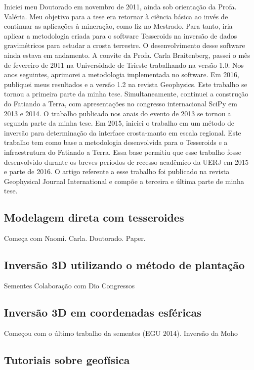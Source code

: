 Iniciei meu Doutorado em novembro de 2011, ainda sob orientação da Profa.
Valéria. Meu objetivo para a tese era retornar à ciência básica ao invés de
continuar as aplicações à mineração, como fiz no Mestrado. Para tanto, iria
aplicar a metodologia criada para o software Tesseroids na inversão de dados
gravimétricos para estudar a crosta terrestre. O desenvolvimento desse software
ainda estava em andamento. A convite da Profa. Carla Braitenberg, passei o mês
de fevereiro de 2011 na Universidade de Trieste trabalhando na versão 1.0. Nos
anos seguintes, aprimorei a metodologia implementada no software. Em 2016,
publiquei meus resultados e a versão 1.2 na revista Geophysics. Este trabalho
se tornou a primeira parte da minha tese. Simultaneamente, continuei a
construção do Fatiando a Terra, com apresentações no congresso internacional
SciPy em 2013 e 2014. O trabalho publicado nos anais do evento de 2013 se
tornou a segunda parte da minha tese. Em 2015, iniciei o trabalho em um método
de inversão para determinação da interface crosta-manto em escala regional.
Este trabalho tem como base a metodologia desenvolvida para o Tesseroids e a
infraestrutura do Fatiando a Terra. Essa base permitiu que esse trabalho fosse
desenvolvido durante os breves períodos de recesso acadêmico da UERJ em 2015 e
parte de 2016. O artigo referente a esse trabalho foi publicado na revista
Geophysical Journal International e compõe a terceira e última parte de minha
tese.



\subsection{Modelagem direta com tesseroides}

Começa com Naomi. Carla. Doutorado.
Paper.

\subsection{Inversão 3D utilizando o método de plantação}

Sementes
Colaboração com Dio
Congressos


\subsection{Inversão 3D em coordenadas esféricas}


Começou com o último trabalho da sementes (EGU 2014).
Inversão da Moho


\subsection{Tutoriais sobre geofísica}

